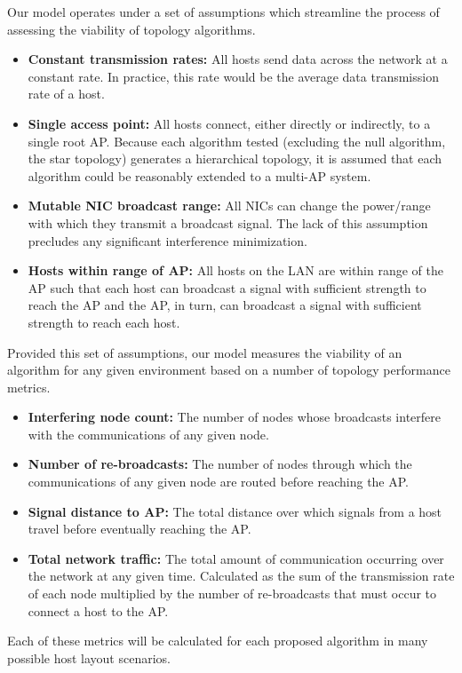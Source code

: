 \documentclass{sigcomm-alternate}
\begin{document}
Our model operates under a set of assumptions which streamline the process of assessing the viability of topology algorithms.
\begin{itemize}
    \item \textbf{Constant transmission rates:} All hosts send data across the network at a constant rate. In practice, this rate would be the average data transmission rate of a host.
    \item \textbf{Single access point:} All hosts connect, either directly or indirectly, to a single root AP. Because each algorithm tested (excluding the null algorithm, the star topology) generates a hierarchical topology, it is assumed that each algorithm could be reasonably extended to a multi-AP system.
    \item \textbf{Mutable NIC broadcast range:} All NICs can change the power/range with which they transmit a broadcast signal. The lack of this assumption precludes any significant interference minimization.
    \item \textbf{Hosts within range of AP:} All hosts on the LAN are within range of the AP such that each host can broadcast a signal with sufficient strength to reach the AP and the AP, in turn, can broadcast a signal with sufficient strength to reach each host.
\end{itemize}

Provided this set of assumptions, our model measures the viability of an algorithm for any given environment based on a number of topology performance metrics.
\begin{itemize}
    \item \textbf{Interfering node count:} The number of nodes whose broadcasts interfere with the communications of any given node. 
    \item \textbf{Number of re-broadcasts:} The number of nodes through which the communications of any given node are routed before reaching the AP.
    \item \textbf{Signal distance to AP:} The total distance over which signals from a host travel before eventually reaching the AP.
    \item \textbf{Total network traffic:} The total amount of communication occurring over the network at any given time. Calculated as the sum of the transmission rate of each node multiplied by the number of re-broadcasts that must occur to connect a host to the AP.
\end{itemize}

Each of these metrics will be calculated for each proposed algorithm in many possible host layout scenarios.
\end{document}
